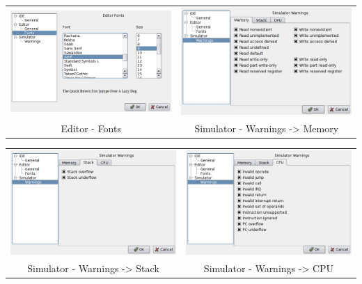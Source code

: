         \begin{table}[h!]
            \begin{tabular}{cc}
                \includegraphics[width=.5\textwidth]{img/interface3.png}
                    &
                \includegraphics[width=.5\textwidth]{img/interface4.png}
                    \\
                Editor - Fonts & Simulator - Warnings -> Memory
            \end{tabular}
        \end{table}

        \begin{table}[h!]
            \begin{tabular}{cc}
                \includegraphics[width=.5\textwidth]{img/interface5.png}
                    &
                \includegraphics[width=.5\textwidth]{img/interface6.png}
                    \\
                Simulator - Warnings -> Stack & Simulator - Warnings -> CPU
            \end{tabular}
        \end{table}

